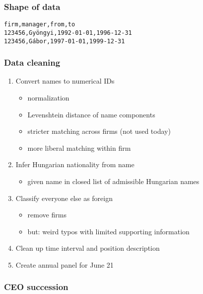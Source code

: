 \documentclass[aspectratio=43,compress,mathserif]{beamer}
\newcommand{\scaffolding}{\draw [->] (0,-0.5) --(14,-0.5);
\draw[thick] (7,-0.5)--(10,-0.5);

\foreach \x in {1,4,7,10,13}
\draw(\x cm,3pt - 0.5cm) -- (\x cm, -3pt - 0.5cm);
}
\begin{document}
\begin{frame}\frametitle{Shape of data}\hypertarget{Shape of data}{}
\texttt{firm,manager,from,to\\
123456,Gyöngyi,1992-01-01,1996-12-31\\
123456,Gábor,1997-01-01,1999-12-31}


\end{frame}



\begin{frame}\frametitle{Data cleaning}\hypertarget{Data cleaning}{}
\begin{enumerate}\setcounter{enumi}{0}
\item Convert names to numerical IDs
\begin{itemize}
\item normalization

\item Levenshtein distance of name components

\item stricter matching across firms (not used today)

\item more liberal matching within firm
\end{itemize}

\item Infer Hungarian nationality from name
\begin{itemize}
\item given name in closed list of admissible Hungarian names
\end{itemize}

\item Classify everyone else as foreign
\begin{itemize}
\item remove firms

\item but: weird typos with limited supporting information
\end{itemize}

\item Clean up time interval and position description

\item Create annual panel for June 21


\end{enumerate}
\end{frame}



\begin{frame}\frametitle{CEO succession}\hypertarget{CEO succession}{}


\end{frame}
\end{document}
